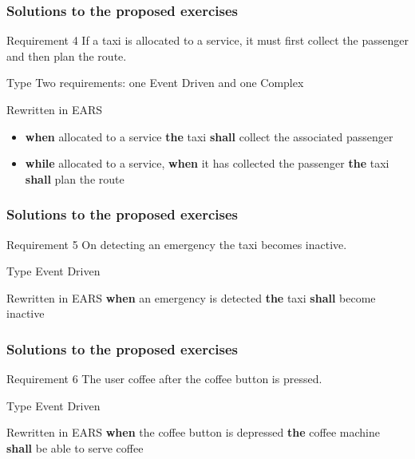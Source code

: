 \documentclass[aspectratio=169]{beamer}
\newcommand{\earse}[3]{{\bf \color{mygreen}when} {#1} {\bf \color{mypurple}the} {#2} {\bf \color{mypurple}shall} {#3}}
\begin{document}
\begin{frame}
  \frametitle{Solutions to the proposed exercises}
  \begin{block}{Requirement 4}
    If a taxi is \alert{allocated} to a service, it must first \alert{collect} the passenger and then \alert{plan} the route.
  \end{block}
  \begin{block}{Type}
   Two requirements: one Event Driven and one Complex
  \end{block}
  \begin{block}{Rewritten in EARS}
  \begin{itemize}
    \item \earse{allocated to a service}{taxi}{collect the associated passenger}
    \item {\bf \color{mygreen} while} allocated to a service, \earse{it has collected the passenger}{taxi}{plan the route}
  \end{itemize}
  \end{block}
\end{frame}

\begin{frame}
  \frametitle{Solutions to the proposed exercises}
  \begin{block}{Requirement 5}
    On detecting an \alert{emergency} the taxi becomes inactive.
  \end{block}
  \begin{block}{Type}
   Event Driven
  \end{block}
  \begin{block}{Rewritten in EARS}
   \earse{an emergency is detected}{taxi}{become inactive}
  \end{block}
\end{frame}

\begin{frame}
  \frametitle{Solutions to the proposed exercises}
  \begin{block}{Requirement 6}
    The user  \alert{coffee} after the \alert{coffee button} is pressed.
  \end{block}
  \begin{block}{Type}
   Event Driven
  \end{block}
  \begin{block}{Rewritten in EARS}
   \earse{the coffee button is depressed}{coffee machine}{be able to serve coffee}
  \end{block}
\end{frame}
\end{document}
